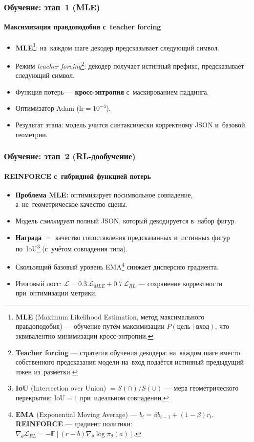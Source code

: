 \documentclass{beamer}
\begin{document}
\begin{frame}
\frametitle{Обучение: этап~1 (MLE)}
\framesubtitle{Максимизация правдоподобия с~teacher forcing}
\begin{itemize}
  \item \textbf{MLE}\footnote{\textbf{MLE} (Maximum Likelihood Estimation, метод максимального правдоподобия) --- обучение путём максимизации $P(\text{цель}\mid\text{вход})$, что эквивалентно минимизации кросс-энтропии.}: на~каждом шаге декодер предсказывает следующий символ.
  \item Режим \emph{teacher forcing}\footnote{\textbf{Teacher forcing} --- стратегия обучения декодера: на~каждом шаге вместо собственного предсказания модели на~вход подаётся истинный предыдущий токен из~разметки.}: декодер получает истинный префикс, предсказывает следующий символ.
  \item Функция потерь --- \textbf{кросс-энтропия} с~маскированием паддинга.
  \item Оптимизатор Adam ($\mathrm{lr}=10^{-4}$).
  \item Результат этапа: модель учится синтаксически корректному JSON и~базовой геометрии.
\end{itemize}
\end{frame}

\begin{frame}
\frametitle{Обучение: этап~2 (RL-дообучение)}
\framesubtitle{REINFORCE с~гибридной функцией потерь}
\begin{itemize}
  \item \textbf{Проблема MLE:} оптимизирует посимвольное совпадение, а~не~геометрическое качество сцены.
  \item Модель \emph{сэмплирует} полный JSON, который декодируется в~набор фигур.
  \item \textbf{Награда} $=$ качество сопоставления предсказанных и~истинных фигур по~IoU\footnote{\textbf{IoU} (Intersection over Union) $= S(\cap)/S(\cup)$ --- мера геометрического перекрытия; $\mathrm{IoU}=1$ при~идеальном совпадении.} (с~учётом совпадения типа).
  \item Скользящий базовый уровень EMA\footnote{\textbf{EMA} (Exponential Moving Average) --- $b_t = \beta b_{t-1}+(1-\beta)r_t$. \textbf{REINFORCE} --- градиент политики: $\nabla_\theta \mathcal{L}_{RL} = -\mathbb{E}[(r-b)\nabla_\theta \log\pi_\theta(a)]$.} снижает дисперсию градиента.
  \item Итоговый лосс: $\mathcal{L}=0.3\,\mathcal{L}_{MLE}+0.7\,\mathcal{L}_{RL}$ --- сохранение корректности при~оптимизации метрики.
\end{itemize}
\end{frame}
\end{document}
